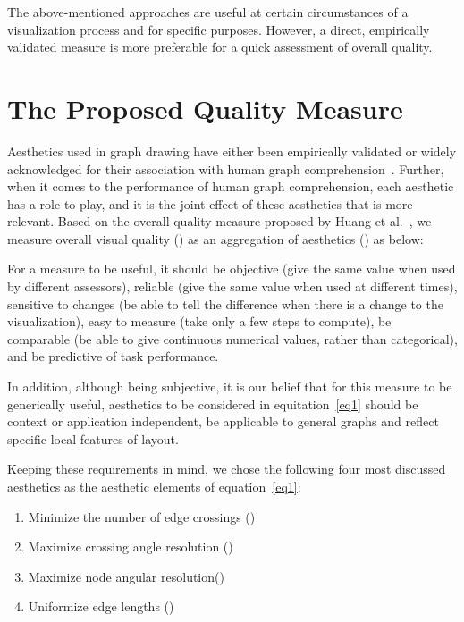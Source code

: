 \documentclass[conference,letterpaper]{IEEEtran}
\begin{document}
The above-mentioned approaches are useful at certain circumstances of a visualization process and for specific purposes. However, a direct, empirically validated measure is more preferable for a quick assessment of overall quality.    


\section{The Proposed Quality Measure}

Aesthetics used in graph drawing have either been empirically validated or widely acknowledged for their association with human graph comprehension~\cite{purchase95,di}. Further, when it comes to the performance of human graph comprehension, each aesthetic has a role to play, and it is the joint effect of these aesthetics that is more relevant. Based on the overall quality measure proposed by Huang et al.~\cite{huang12}, we measure overall visual quality () as an aggregation of aesthetics () as below:



For a measure to be useful, it should be objective (give the same value when used by different assessors), reliable (give the same value when used at different times), sensitive to changes (be able to tell the difference when there is a change to the visualization), easy to measure (take only a few steps to compute), be comparable (be able to give continuous numerical values, rather than categorical), and be predictive of task performance.



In addition, although being subjective, it is our belief that for this measure to be generically useful, aesthetics to be considered in equitation~\ref{eq1} should be context or application independent, be applicable to general graphs and reflect specific local features of layout.

Keeping these requirements in mind, we chose the following four most discussed aesthetics as the aesthetic elements of equation~\ref{eq1}:

\begin{enumerate}
\item{Minimize the number of edge crossings ()}
\item{Maximize crossing angle resolution ()}
\item{Maximize node angular resolution()}
\item{Uniformize edge lengths ()}


\end{enumerate}
\end{document}
